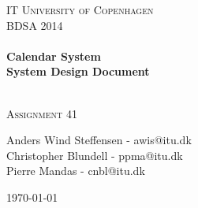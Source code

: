 


%


\begin{center}
\thispagestyle{empty}


\textsc{\LARGE IT University of Copenhagen}\\[1.5cm]

\textsc{\Large BDSA 2014 }\\[0.5cm]

\HRule \\[0.4cm]
{ \huge \bfseries Calendar System \\ System Design Document\\ [0.4cm]
    }

\HRule \\[1cm]

\textsc{\Large Assignment 41 }\\[1.5cm]

\begin{minipage}{1\textwidth}
\begin{center} \large
Anders Wind Steffensen - awis@itu.dk\\
Christopher Blundell - ppma@itu.dk\\
Pierre Mandas - cnbl@itu.dk\\
\end{center}
\end{minipage}


\vfill

{\large \today}

\end{center}

\frontmatter%

%
%


\tableofcontents
\newpage

\mainmatter%



%


%


